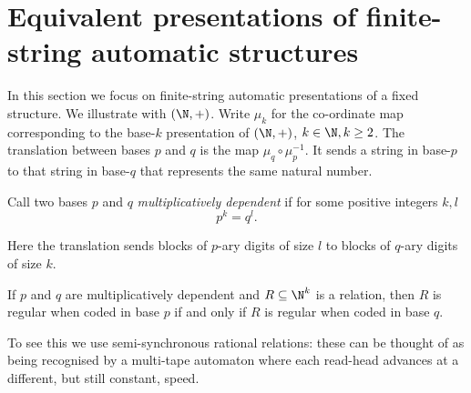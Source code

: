 \section{Equivalent presentations of finite-string automatic structures}

In this section we focus on finite-string automatic presentations of a fixed structure. We illustrate with
$(\N,+)$.
Write $\mu_k$ for the co-ordinate map corresponding to the base-$k$ presentation of $(\N,+)$, $k \in \N, k \geq 2$.
The translation between bases $p$ and $q$ is the map $\mu_q \circ \mu_p^{-1}$. It sends a string in base-$p$ to that
string in base-$q$ that represents the same natural number.

Call two bases $p$ and $q$ {\em multiplicatively dependent} if for some positive integers
$k,l$
\[
 p^k = q^l.
\]

Here the translation sends blocks of $p$-ary digits of size $l$ to blocks of $q$-ary digits of 
size $k$.

\begin{proposition} \label{AS:prop:multdep}
If $p$ and $q$ are multiplicatively dependent and $R \subseteq \N^k$ is a relation, then 
$R$ is regular when coded in base $p$ if and only if $R$ is regular when coded in base $q$.
\end{proposition}

To see this we use semi-synchronous rational relations: these can be thought of as being
recognised by a multi-tape automaton where each read-head advances at a
different, but still constant, speed.

